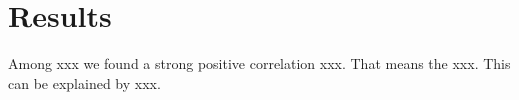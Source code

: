 \section{Results}\label{sec:METHODRESULTS}


Among xxx we found a strong positive correlation xxx. That means the xxx.
This can be explained by xxx.